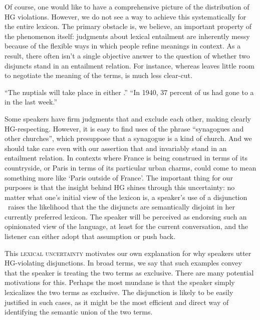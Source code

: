 \documentclass[12pt,twoside]{article}
\renewcommand{\_}{\textbf{\textunderscore\hspace{-4pt}\textunderscore\hspace{-3pt}\textunderscore\hspace{-4pt}\textunderscore}\hspace{0.5pt}}			%
\newcommand{\technicalTerm}[1]{\textsc{#1}}
\begin{document}
Of course, one would like to have a comprehensive picture of the
distribution of HG violations. However, we do not see a way to achieve
this systematically for the entire lexicon. The primary obstacle is,
we believe, an important property of the phenomenon itself: judgments
about lexical entailment are inherently messy because of the flexible
ways in which people refine meanings in context. As a result, there
often isn't a single objective answer to the question of whether two
disjuncts stand in an entailment relation. For instance, whereas
 leaves little room to negotiate the
meaning of the terms,  is much
less clear-cut.
%
\begin{exe}
\ex\label{exclusive}
  \begin{xlist}
  \ex\label{franceorparis} ``The nuptials will take place in either
    .''
  \ex\label{churchorsynagogue} ``In 1940, 37 percent of us had gone
    to a  in the last week.''
  \end{xlist}
\end{exe}
%
Some speakers have firm judgments that  and
 exclude each other, making
 clearly HG-respecting. However,
it is easy to find uses of the phrase ``synagogues and other
churches'', which presuppose that a synagogue is a kind of church. And
we should take care even with our assertion that  and
 invariably stand in an entailment relation. In contexts
where France is being construed in terms of its countryside, or Paris
in terms of its particular urban charms,  could come to
mean something more like `Paris outside of France'. The important
thing for our purposes is that the insight behind HG shines through
this uncertainty: no matter what one's initial view of the lexicon is,
a speaker's use of a disjunction \XorY\ raises the likelihood that the
the disjuncts are semantically disjoint in her currently preferred
lexicon. The speaker will be perceived as endorsing such an
opinionated view of the language, at least for the current
conversation, and the listener can either adopt that assumption or
push back.

This \technicalTerm{lexical uncertainty} motivates our own explanation
for why speakers utter HG-violating disjunctions. In broad terms, we
say that such examples convey that the speaker is treating the two
terms as exclusive. There are many potential motivations for
this. Perhaps the most mundane is that the speaker simply lexicalizes
the two terms as exclusive. The disjunction is likely to be easily
justified in such cases, as it might be the most efficient and direct
way of identifying the semantic union of the two terms.
\end{document}
